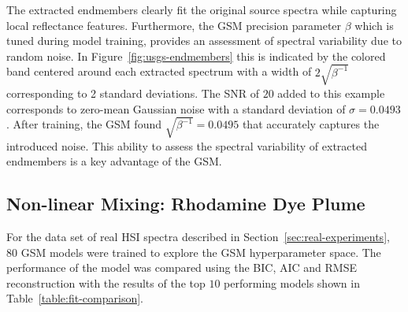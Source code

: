 The extracted endmembers clearly fit the original source spectra while capturing
local reflectance features. Furthermore, the GSM precision parameter $\beta$
which is tuned during model training, provides an assessment of spectral
variability due to random noise. In Figure~\ref{fig:usgs-endmembers} this is
indicated by the colored band centered around each extracted spectrum with a
width of $2\sqrt{\beta^{-1}}$ corresponding to 2 standard deviations. The SNR of
$20$ added to this example corresponds to zero-mean Gaussian noise with a
standard deviation of $\sigma=0.0493$. After training, the GSM found
$\sqrt{\beta^{-1}}=0.0495$ that accurately captures the introduced noise. This
ability to assess the spectral variability of extracted endmembers is a key
advantage of the GSM.


\subsection{Non-linear Mixing: Rhodamine Dye Plume}

For the data set of real HSI spectra described in Section~\ref{sec:real-experiments},
80 GSM models were trained to explore the GSM hyperparameter space. The
performance of the model was compared using the BIC, AIC and RMSE reconstruction
with the results of the top $10$ performing models shown in
Table~\ref{table:fit-comparison}.


